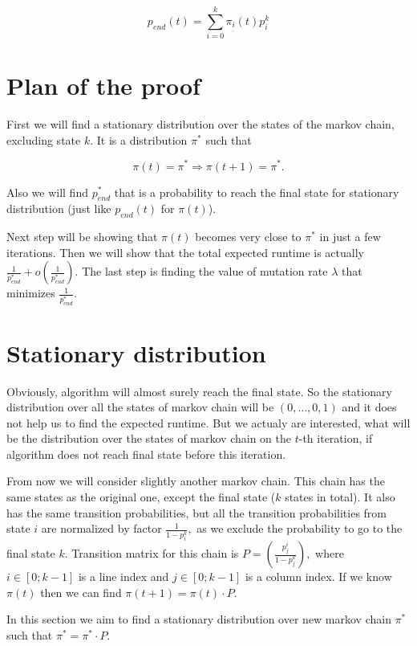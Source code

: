 \documentclass{article}
\begin{document}
$$p_{end}(t) = \sum\limits_{i = 0}^k \pi_i(t) p_i^k$$

\section{Plan of the proof}

First we will find a stationary distribution over the states of the markov chain, excluding state $k$. It is a distribution $\pi^*$ such that

$$\pi(t) = \pi^* \Rightarrow \pi(t + 1) = \pi^*.$$

Also we will find $p_{end}^*$ that is a probability to reach the final state for stationary distribution (just like $p_{end}(t)$ for $\pi(t)$).

Next step will be showing that $\pi(t)$ becomes very close to $\pi^*$ in just a few iterations. Then we will show that the total expected runtime is actually $\frac{1}{p_{end}^*} +o\left(\frac{1}{p_{end}^*} \right)$. The last step is finding the value of mutation rate $\lambda$ that minimizes $\frac{1}{p_{end}^*}.$

\section{Stationary distribution}

Obviously, algorithm will almost surely reach the final state. So the stationary distribution over all the states of markov chain will be $(0, \dots, 0, 1)$ and it does not help us to find the expected runtime. But we actualy are interested, what will be the distribution over the states of markov chain on the $t$-th iteration, if algorithm does not reach final state before this iteration.

From now we will consider slightly another markov chain. This chain has the same states as the original one, except the final state ($k$ states in total). It also has the same transition probabilities, but all the transition probabilities from state $i$ are normalized by factor $\frac{1}{1 - p_i^k},$ as we exclude the probability to go to the final state $k$. Transition matrix for this chain is $P = \left(\frac{p_j^i}{1 - p_j^k}\right),$ where $i \in [0; k - 1]$ is a line index and $j \in [0;k - 1]$ is a column index. If we know $\pi(t)$ then we can find $\pi(t + 1) = \pi(t) \cdot P.$

In this section we aim to find a stationary distribution over new markov chain $\pi^*$ such that $\pi^* = \pi^* \cdot P.$
\end{document}
